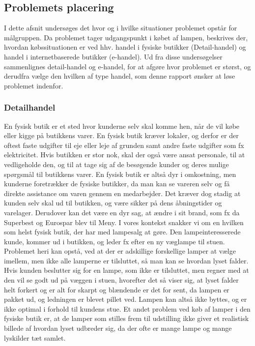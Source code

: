 \subsection{Problemets placering}
I dette afsnit undersøges det hvor og i hvilke situationer problemet opstår for målgruppen. Da problemet tager udgangspunkt i købet af lampen, beskrives der, hvordan købssituationen er ved hhv. handel i fysiske butikker (Detail-handel) og handel i internetbaserede butikker (e-handel). Ud fra disse undersøgelser sammenlignes detail-handel og e-handel, for at afgøre hvor problemet er størst, og derudfra vælge den hvilken af type handel, som denne rapport ønsker at løse problemet indenfor.

\subsubsection{Detailhandel}
En fysisk butik er et sted hvor kunderne selv skal komme hen, når de vil købe eller kigge på butikkens varer. En fysisk butik kræver lokaler, og derfor er der oftest faste udgifter til eje eller leje af grunden samt andre faste udgifter som fx elektricitet. Hvis butikken er stor nok, skal der også være ansat personale, til at vedligeholde den, og til at tage sig af de besøgende kunder og deres mulige spørgsmål til butikkens varer. En fysisk butik er altså dyr i omkostning, men kunderne foretrækker de fysiske butikker, da man kan se vareren selv og få direkte assistance om varen gennem en medarbejder. Det kræver dog stadig at kunden selv skal ud til butikken, og være sikker på dens åbningstider og varelager. Derudover kan det være en dyr sag, at ændre i sit brand, som fx da Superbest og Eurospar blev til Meny.
I vores kontekst snakker vi om en hvilken som helst fysisk butik, der har med lampesalg at gøre. Den lampeinteresserede kunde, kommer ud i butikken, og leder fx efter en ny væglampe til stuen. Problemet heri kan opstå, ved at der er adskillige forskellige lamper at vælge imellem, men ikke alle lamperne er tilsluttet, så man kan se hvordan lyset falder. Hvis kunden beslutter sig for en lampe, som ikke er tilsluttet, men regner med at den vil se godt ud på væggen i stuen, hvorefter det så viser sig, at lyset falder helt forkert og er alt for skarpt og blændende er det for sent, da lampen er pakket ud, og ledningen er blevet pillet ved. Lampen kan altså ikke byttes, og er ikke optimal i forhold til kundens stue. Et andet problem ved køb af lamper i den fysiske butik er, at de lamper som stilles frem til udstilling ikke giver et realistisk billede af hvordan lyset udbreder sig, da der ofte er mange lampe og mange lyskilder tæt samlet. 

